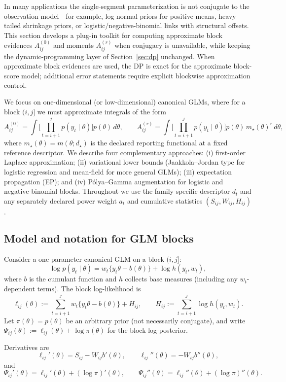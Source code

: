 In many applications the single-segment parameterization is not conjugate to the observation
model---for example, log-normal priors for positive means, heavy-tailed shrinkage priors, or
logistic/negative-binomial links with structural offsets. This section develops a plug-in
toolkit for computing approximate block evidences $A^{(0)}_{ij}$ and moments $A^{(r)}_{ij}$
when conjugacy is unavailable, while keeping the dynamic-programming layer of
Section~\ref{sec:dp} unchanged. When approximate block evidences are used, the DP is exact for
the approximate block-score model; additional error statements require explicit blockwise
approximation control.

We focus on one-dimensional (or low-dimensional) canonical GLMs, where for a block $(i,j]$ we
must approximate integrals of the form
\[
A^{(0)}_{ij}
 = \int \Big[\prod_{t=i+1}^j p(y_t\mid\theta)\Big] p(\theta)\,d\theta,\qquad
A^{(r)}_{ij}
 = \int \Big[\prod_{t=i+1}^j p(y_t\mid\theta)\Big] p(\theta)\,m_\star(\theta)^r\,d\theta,
\]
where $m_\star(\theta)=m(\theta;d_\star)$ is the declared reporting functional at a fixed reference descriptor. We describe four complementary approaches:
(i) first-order Laplace approximation; (ii) variational lower bounds (Jaakkola--Jordan \citep{jaakkola2000logisticvb} type
for logistic regression and mean-field for more general GLMs); (iii) expectation propagation
(EP); and (iv) P\'olya--Gamma augmentation for logistic and negative-binomial blocks. Throughout
we use the family-specific descriptor $d_t$ and any separately declared power weight $a_t$ and cumulative statistics $(S_{ij},W_{ij},H_{ij})$.

\subsection{Model and notation for GLM blocks}

Consider a one-parameter canonical GLM on a block $(i,j]$:
\[
\log p(y_t\mid\theta)
 = w_t\big\{ y_t\theta - b(\theta)\big\} + \log h(y_t,w_t),
\]
where $b$ is the cumulant function and $h$ collects base measures (including any $w_t$-dependent
terms). The block log-likelihood is
\[
\ell_{ij}(\theta)
 := \sum_{t=i+1}^j w_t\{y_t\theta - b(\theta)\} + H_{ij},
\qquad
H_{ij}:=\sum_{t=i+1}^j \log h(y_t,w_t).
\]
Let $\pi(\theta)=p(\theta)$ be an arbitrary prior (not necessarily conjugate), and write
$\Psi_{ij}(\theta):=\ell_{ij}(\theta)+\log\pi(\theta)$ for the block log-posterior.

Derivatives are
\[
\ell_{ij}'(\theta) = S_{ij} - W_{ij} b'(\theta),\qquad
\ell_{ij}''(\theta) = -W_{ij} b''(\theta),
\]
and
\[
\Psi_{ij}'(\theta) = \ell_{ij}'(\theta) + (\log\pi)'(\theta),\qquad
\Psi_{ij}''(\theta) = \ell_{ij}''(\theta) + (\log\pi)''(\theta).
\]

